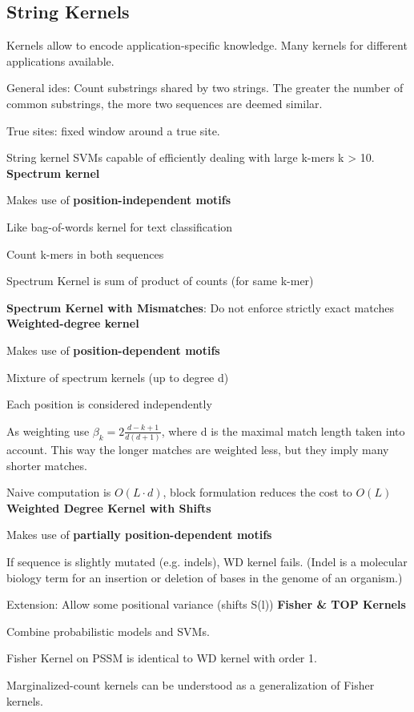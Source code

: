 \documentclass[12pt]{article}
\begin{document}
\subsection{String Kernels}
\par Kernels allow to encode application-specific knowledge. Many kernels for different applications available.
\par General ides: Count substrings shared by two strings. The greater the number of common substrings, the more two sequences are deemed similar.
\par True sites: fixed window around a true site.
\par String kernel SVMs capable of efficiently dealing with large k-mers k > 10.
\\
\textbf{Spectrum kernel}
\ulb
\item Makes use of \textbf{position-independent motifs}
\item Like bag-of-words kernel for text classification
\item Count k-mers in both sequences
\item Spectrum Kernel is sum of product of counts (for same k-mer)
\item \textbf{Spectrum Kernel with Mismatches}: Do not enforce strictly exact matches
\ule
\textbf{Weighted-degree kernel}
\ulb
\item Makes use of \textbf{position-dependent motifs}
\item Mixture of spectrum kernels (up to degree d)
\item Each position is considered independently
\item As weighting use $\beta_k = 2\frac{d-k+1}{d(d+1)}$, where d is the maximal match length taken into account. This way the longer matches are weighted less, but they imply many shorter matches.
\item Naive computation is $O(L \cdot d)$, block formulation reduces the cost to $O(L)$
\ule
\textbf{Weighted Degree Kernel with Shifts}
\ulb
\item Makes use of \textbf{partially position-dependent motifs}
\item If sequence is slightly mutated (e.g. indels), WD kernel fails. (Indel is a molecular biology term for an insertion or deletion of bases in the genome of an organism.)
\item Extension: Allow some positional variance (shifts S(l))
\ule
\textbf{Fisher \& TOP Kernels}
\ulb
\item Combine probabilistic models and SVMs.
\item Fisher Kernel on PSSM is identical to WD kernel with order 1.
\item Marginalized-count kernels can be understood as a generalization of Fisher kernels.
\ule
\end{document}
